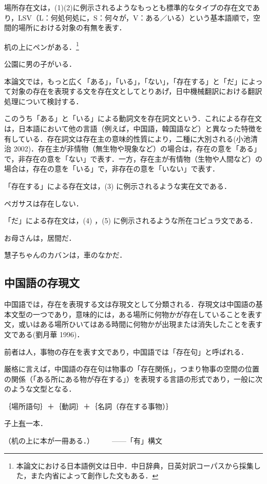\documentclass[japanese]{jnlp_1.4}
\newcommand{\inHRei}[1]{}
\begin{document}
場所存在文は，(1)(2)に例示されるようなもっとも標準的なタイプの存在文であり，LSV（L：何処何処に，S：何々が，V：ある／いる）という基本語順で，空間的場所における対象の有無を表す．

\inHRei{(1)}
机の上にペンがある．\footnote{
	本論文における日本語例文は日中．中日辞典，日英対訳コーパスから採集した，また内省によって創作した文もある．}

\inHRei{(2)}
公園に男の子がいる．

本論文では，もっと広く「ある」，「いる」，「ない」，「存在する」と「だ」によって対象の存在を表現する文を存在文としてとりあげ，日中機械翻訳における翻訳処理について検討する．

このうち「ある」と「いる」による動詞文を存在詞文という．これによる存在文は，日本語において他の言語（例えば，中国語，韓国語など）と異なった特徴を有している．存在詞文は存在主の意味的性質により，二種に大別される(小池清治 2002)．存在主が非情物（無生物や現象など）の場合は，存在の意を「ある」で，非存在の意を「ない」で表す．一方，存在主が有情物（生物や人間など）の場合は，存在の意を「いる」で，非存在の意を「いない」で表す．

「存在する」による存在文は，(3) に例示されるような実在文である．

\inHRei{(3)}
ペガサスは存在しない．

「だ」による存在文は，(4) ，(5) に例示されるような所在コピュラ文である．

\inHRei{(4)}
お母さんは，居間だ．

\inHRei{(5)}
慧子ちゃんのカバンは，車のなかだ．


\subsection{中国語の存現文}

中国語では，存在を表現する文は存現文として分類される．存現文は中国語の基本文型の一つであり，意味的には，ある場所に何物かが存在していることを表す文，或いはある場所ひいてはある時間に何物かが出現または消失したことを表す文である(劉月華 1996)．

前者は人，事物の存在を表す文であり，中国語では「存在句」と呼ばれる．

厳格に言えば，中国語の存在句は物事の「存在関係」，つまり物事の空間の位置の関係（「ある所にある物が存在する」）を表現する言語の形式であり，一般に次のような文型となる．

｛場所語句｝＋｛動詞｝＋｛名詞（存在する事物）｝

\inHRei{(6)}
\begin{簡体中文}子上\ul{有}一本．\end{簡体中文}（机の上に本が一冊ある．）　　　——「有」構文
\end{document}
